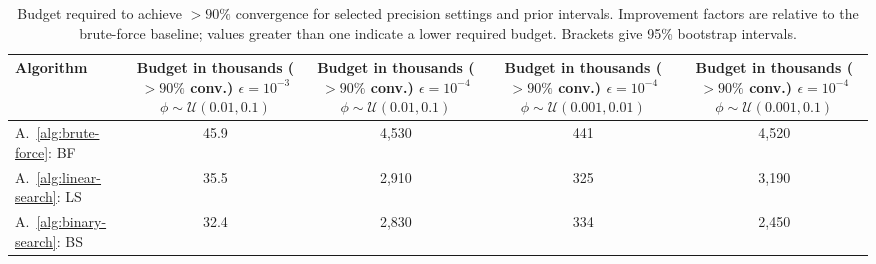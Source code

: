 \begin{table}[ht]
\centering
\scriptsize
\caption{Budget required to achieve $>90\%$ convergence for selected precision settings and prior intervals. Improvement factors are relative to the brute-force baseline; values greater than one indicate a lower required budget. Brackets give 95\% bootstrap intervals.}
\label{tab:summary-all-ci}
\begin{tabular}{l c c c c}
\toprule
Algorithm
& \makecell{Budget in thousands\\ ($>90\%$ conv.) \\ $\epsilon={10^{-3}}$ \\ $\phi \sim \mathcal{U}(0.01,0.1)$}
& \makecell{Budget in thousands\\ ($>90\%$ conv.) \\ $\epsilon={10^{-4}}$ \\ $\phi \sim \mathcal{U}(0.01,0.1)$}
& \makecell{Budget in thousands\\ ($>90\%$ conv.) \\ $\epsilon={10^{-4}}$ \\ $\phi \sim \mathcal{U}(0.001,0.01)$}
& \makecell{Budget in thousands\\ ($>90\%$ conv.) \\ $\epsilon={10^{-4}}$ \\ $\phi \sim \mathcal{U}(0.001,0.1)$} \\
\midrule
A.~\ref{alg:brute-force}: BF
& 45.9 \newline {\scriptsize [45.3, 46.5]}
& 4{,}530 \newline {\scriptsize [4{,}460, 4{,}590]}
& 441 \newline {\scriptsize [436, 447]}
& 4{,}520 \newline {\scriptsize [4{,}460, 4{,}580]} \\
A.~\ref{alg:linear-search}: LS
& 35.5 \newline {\scriptsize [34.9, 36]}
& 2{,}910 \newline {\scriptsize [2{,}860, 2{,}960]}
& 325 \newline {\scriptsize [321, 329]}
& 3{,}190 \newline {\scriptsize [3{,}150, 3{,}240]} \\
A.~\ref{alg:binary-search}: BS
& 32.4 \newline {\scriptsize [32, 32.9]}
& 2{,}830 \newline {\scriptsize [2{,}800, 2{,}870]}
& 334 \newline {\scriptsize [330, 338]}
& 2{,}450 \newline {\scriptsize [2{,}420, 2{,}480]} \\

\end{tabular}
\end{table}
